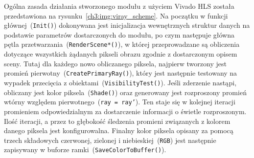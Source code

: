 
Ogólna zasada działania stworzonego modułu z użyciem Vivado HLS została przedstawiona na rysunku~\ref{ch3:img:viray_scheme}. Na początku w funkcji głównej~(\texttt{Init()}) dokonywana jest inicjalizacja wewnętrznych struktur danych na podstawie parametrów dostarczonych do modułu, po czym następuje główna pętla przetwarzania~(\texttt{RenderScene*()}), w której przeprowadzane są obliczenia dotyczące wszystkich żądanych pikseli obrazu zgodnie z dostarczonym opisem sceny. Tutaj dla każdego nowo obliczanego piksela, najpierw tworzony jest promień pierwotny~(\texttt{CreatePrimaryRay()}), który jest następnie testowany na wypadek przecięcia z obiektami~(\texttt{VisibilityTest()}). Jeśli zderzenie nastąpi, obliczany jest kolor piksela~(\texttt{Shade()}) oraz generowany jest rozproszony promień wtórny względem pierwotnego~(\texttt{ray = ray'}). Ten staje się w kolejnej iteracji promieniem odpowiedzialnym za dostarczenie informacji o świetle rozproszonym. Ilość iteracji, a przez to głębokość śledzenia promieni związanych z kolorem danego piksela jest konfigurowalna. Finalny kolor piksela opisany za pomocą trzech składowych czerwonej, zielonej i niebieskiej~(\texttt{RGB}) jest następnie zapisywany w buforze ramki~(\texttt{SaveColorToBuffer()}).

